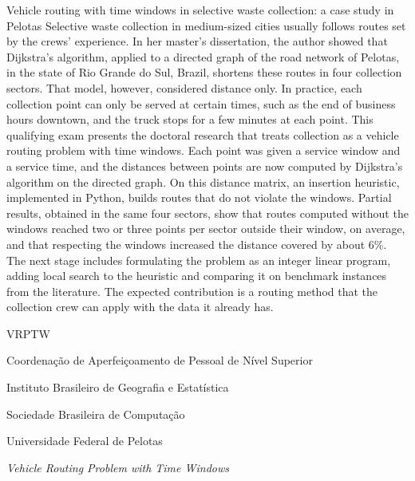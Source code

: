 \documentclass[eq,capa]{texufpel}
\begin{document}
\begin{englishabstract}{Vehicle routing with time windows in selective waste collection: a case study in Pelotas}
Selective waste collection in medium-sized cities usually follows routes set
by the crews' experience. In her master's dissertation, the author showed that
Dijkstra's algorithm, applied to a directed graph of the road network of
Pelotas, in the state of Rio Grande do Sul, Brazil, shortens these routes in
four collection sectors. That model, however, considered distance only. In
practice, each collection point can only be served at certain times, such as
the end of business hours downtown, and the truck stops for a few minutes at
each point. This qualifying exam presents the doctoral research that treats
collection as a vehicle routing problem with time windows. Each point was
given a service window and a service time, and the distances between points
are now computed by Dijkstra's algorithm on the directed graph. On this
distance matrix, an insertion heuristic, implemented in Python, builds routes
that do not violate the windows. Partial results, obtained in the same four
sectors, show that routes computed without the windows reached two or three
points per sector outside their window, on average, and that respecting the
windows increased the distance covered by about 6\%. The next stage includes
formulating the problem as an integer linear program, adding local search to
the heuristic and comparing it on benchmark instances from the literature.
The expected contribution is a routing method that the collection crew can
apply with the data it already has.
\end{englishabstract}

\listoffigures
\listofquadros   %
\listoftables

\begin{listofabbrv}{VRPTW}
  \item[CAPES] Coordenação de Aperfeiçoamento de Pessoal de Nível Superior
  \item[IBGE]  Instituto Brasileiro de Geografia e Estatística
  \item[SBC]   Sociedade Brasileira de Computação
  \item[UFPel] Universidade Federal de Pelotas
  \item[VRPTW] \textit{Vehicle Routing Problem with Time Windows}
\end{listofabbrv}
\end{document}
